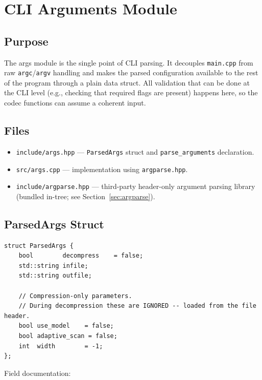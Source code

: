 \section{CLI Arguments Module}

\subsection{Purpose}

The args module is the single point of CLI parsing.
It decouples \texttt{main.cpp} from raw \texttt{argc}/\texttt{argv} handling and makes the
parsed configuration available to the rest of the program through a plain data struct.
All validation that can be done at the CLI level (e.g., checking that required flags are
present) happens here, so the codec functions can assume a coherent input.

\subsection{Files}

\begin{itemize}
  \item \texttt{include/args.hpp} --- \texttt{ParsedArgs} struct and \texttt{parse\_arguments}
        declaration.
  \item \texttt{src/args.cpp} --- implementation using \texttt{argparse.hpp}.
  \item \texttt{include/argparse.hpp} --- third-party header-only argument parsing library
        (bundled in-tree; see Section~\ref{sec:argparse}).
\end{itemize}

\subsection{ParsedArgs Struct}

\begin{lstlisting}[style=cpp]
struct ParsedArgs {
    bool        decompress    = false;
    std::string infile;
    std::string outfile;

    // Compression-only parameters.
    // During decompression these are IGNORED -- loaded from the file header.
    bool use_model    = false;
    bool adaptive_scan = false;
    int  width        = -1;
};
\end{lstlisting}

Field documentation:

